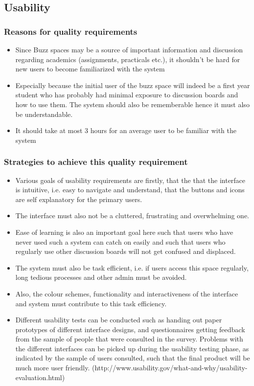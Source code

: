 \documentclass[a4paper,12pt]{report}
\begin{document}
 \subsection{Usability}
 \subsubsection{Reasons for quality requirements}
 \begin{itemize}
 \item Since Buzz spaces may be a source of important information and discussion regarding academics (assignments, practicals etc.), it shouldn't be hard for new users to become familiarized with the system
	\item Especially because the initial user of the buzz space will indeed be a first year student who has probably had minimal exposure to discussion boards and how to use them. The system should also be rememberable hence it must also be understandable. 
	\item It should take at most 3 hours for an average user to be familiar with the system
 \end{itemize}
 \subsubsection{Strategies to achieve this quality requirement}
 \begin{itemize}
 \item Various goals of usability requirements are firstly, that the that the interface is intuitive, i.e. easy to navigate and understand, that the buttons and icons are self explanatory for the primary users.
 \item The interface must also not be a cluttered, frustrating and overwhelming one. 
 \item Ease of learning is also an important goal here such that users who have never used such a system can catch on easily and such that users who regularly use other discussion boards will not get confused and displaced. 
 \item The system must also be task efficient, i.e. if users access this space regularly, long tedious processes and other admin must be avoided.
\item Also, the colour schemes, functionality and interactiveness of the interface and system must contribute to this task efficiency. 
\item Different usability tests can be conducted such as handing out paper prototypes of different interface designs, and questionnaires getting feedback from the sample of people that were consulted in the survey. Problems with the different interfaces can be picked up during the usability testing phase, as indicated by the sample of users consulted, such that the final product will be much more user friendly. (http://www.usability.gov/what-and-why/usability-evaluation.html)
 \end{itemize}
\end{document}
